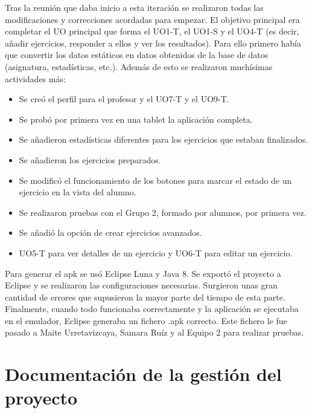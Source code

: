 Tras la reunión que daba inicio a esta iteración se realizaron todas las modificaciones y correcciones acordadas para empezar. El objetivo principal era completar el UO principal que forma el UO1-T, el UO1-S y el UO4-T (es decir, añadir ejercicios, responder a ellos y ver los resultados). Para ello primero había que convertir los datos estáticos en datos obtenidos de la base de datos (asignatura, estadísticas, etc.). Además de esto se realizaron muchísimas actividades más:

\begin{itemize}
\item Se creó el perfil para el profesor y el UO7-T y el UO9-T.
\item Se probó por primera vez en una tablet la aplicación completa.
\item Se añadieron estadísticas diferentes para los ejercicios que estaban finalizados.
\item Se añadieron los ejercicios preparados.
\item Se modificó el funcionamiento de los botones para marcar el estado de un ejercicio en la vista del alumno.
\item Se realizaron pruebas con el Grupo 2, formado por alumnos, por primera vez.
\item Se añadió la opción de crear ejercicios avanzados.
\item UO5-T para ver detalles de un ejercicio y UO6-T para editar un ejercicio.
\end{itemize}

Para generar el apk se usó Eclipse Luna y Java 8. Se exportó el proyecto a Eclipse y se realizaron las configuraciones necesarias. Surgieron unas gran cantidad de errores que supusieron la mayor parte del tiempo de esta parte. Finalmente, cuando todo funcionaba correctamente y la aplicación se ejecutaba en el emulador, Eclipse generaba un fichero .apk correcto. Este fichero le fue pasado a Maite Urretavizcaya, Samara Ruíz y al Equipo 2 para realizar pruebas. \\


\section{Documentación de la gestión del proyecto}
\label{dgp}

